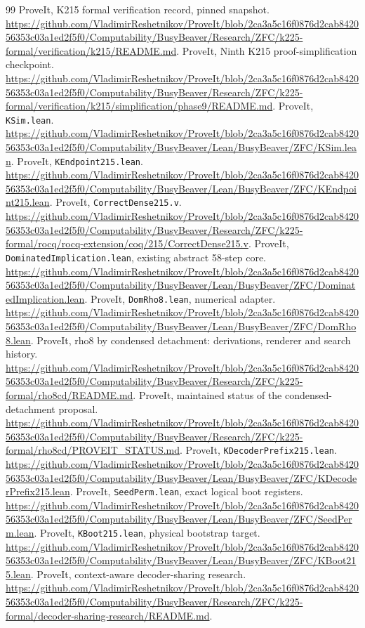 \documentclass[11pt]{article}
\newcommand{\code}[1]{\texttt{\small #1}}
\begin{document}
\clearpage
\begin{thebibliography}{99}\small
{} ProveIt, K215 formal verification record, pinned snapshot. \url{https://github.com/VladimirReshetnikov/ProveIt/blob/2ca3a5c16f0876d2cab842056353c03a1ed2f5f0/Computability/BusyBeaver/Research/ZFC/k225-formal/verification/k215/README.md}.
 ProveIt, Ninth K215 proof-simplification checkpoint. \url{https://github.com/VladimirReshetnikov/ProveIt/blob/2ca3a5c16f0876d2cab842056353c03a1ed2f5f0/Computability/BusyBeaver/Research/ZFC/k225-formal/verification/k215/simplification/phase9/README.md}.
 ProveIt, \code{KSim.lean}. \url{https://github.com/VladimirReshetnikov/ProveIt/blob/2ca3a5c16f0876d2cab842056353c03a1ed2f5f0/Computability/BusyBeaver/Lean/BusyBeaver/ZFC/KSim.lean}.
 ProveIt, \code{KEndpoint215.lean}. \url{https://github.com/VladimirReshetnikov/ProveIt/blob/2ca3a5c16f0876d2cab842056353c03a1ed2f5f0/Computability/BusyBeaver/Lean/BusyBeaver/ZFC/KEndpoint215.lean}.
 ProveIt, \code{CorrectDense215.v}. \url{https://github.com/VladimirReshetnikov/ProveIt/blob/2ca3a5c16f0876d2cab842056353c03a1ed2f5f0/Computability/BusyBeaver/Research/ZFC/k225-formal/rocq/rocq-extension/coq/215/CorrectDense215.v}.
 ProveIt, \code{DominatedImplication.lean}, existing abstract 58-step core. \url{https://github.com/VladimirReshetnikov/ProveIt/blob/2ca3a5c16f0876d2cab842056353c03a1ed2f5f0/Computability/BusyBeaver/Lean/BusyBeaver/ZFC/DominatedImplication.lean}.
 ProveIt, \code{DomRho8.lean}, numerical adapter. \url{https://github.com/VladimirReshetnikov/ProveIt/blob/2ca3a5c16f0876d2cab842056353c03a1ed2f5f0/Computability/BusyBeaver/Lean/BusyBeaver/ZFC/DomRho8.lean}.
 ProveIt, rho8 by condensed detachment: derivations, renderer and search history. \url{https://github.com/VladimirReshetnikov/ProveIt/blob/2ca3a5c16f0876d2cab842056353c03a1ed2f5f0/Computability/BusyBeaver/Research/ZFC/k225-formal/rho8cd/README.md}.
 ProveIt, maintained status of the condensed-detachment proposal. \url{https://github.com/VladimirReshetnikov/ProveIt/blob/2ca3a5c16f0876d2cab842056353c03a1ed2f5f0/Computability/BusyBeaver/Research/ZFC/k225-formal/rho8cd/PROVEIT_STATUS.md}.
 ProveIt, \code{KDecoderPrefix215.lean}. \url{https://github.com/VladimirReshetnikov/ProveIt/blob/2ca3a5c16f0876d2cab842056353c03a1ed2f5f0/Computability/BusyBeaver/Lean/BusyBeaver/ZFC/KDecoderPrefix215.lean}.
 ProveIt, \code{SeedPerm.lean}, exact logical boot registers. \url{https://github.com/VladimirReshetnikov/ProveIt/blob/2ca3a5c16f0876d2cab842056353c03a1ed2f5f0/Computability/BusyBeaver/Lean/BusyBeaver/ZFC/SeedPerm.lean}.
 ProveIt, \code{KBoot215.lean}, physical bootstrap target. \url{https://github.com/VladimirReshetnikov/ProveIt/blob/2ca3a5c16f0876d2cab842056353c03a1ed2f5f0/Computability/BusyBeaver/Lean/BusyBeaver/ZFC/KBoot215.lean}.
 ProveIt, context-aware decoder-sharing research. \url{https://github.com/VladimirReshetnikov/ProveIt/blob/2ca3a5c16f0876d2cab842056353c03a1ed2f5f0/Computability/BusyBeaver/Research/ZFC/k225-formal/decoder-sharing-research/README.md}.
\end{thebibliography}
\end{document}
